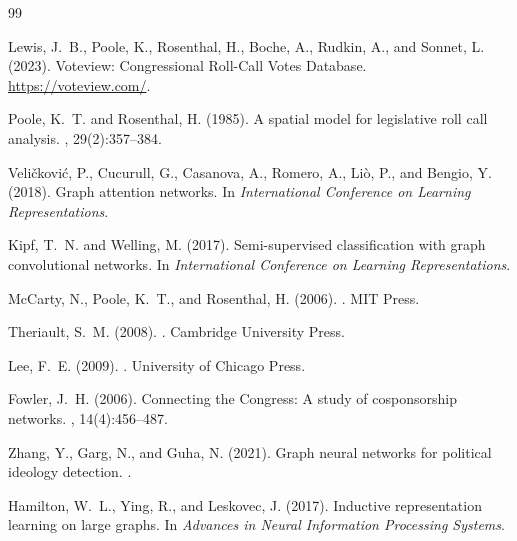 \documentclass[11pt]{article}
\begin{document}
\begin{thebibliography}{99}

Lewis, J.~B., Poole, K., Rosenthal, H., Boche, A., Rudkin, A., and Sonnet, L. (2023).
\newblock Voteview: Congressional Roll-Call Votes Database.
\newblock \url{https://voteview.com/}.

Poole, K.~T. and Rosenthal, H. (1985).
\newblock A spatial model for legislative roll call analysis.
, 29(2):357--384.

Veli\v{c}kovi\'{c}, P., Cucurull, G., Casanova, A., Romero, A., Li\`{o}, P., and Bengio, Y. (2018).
\newblock Graph attention networks.
\newblock In {\em International Conference on Learning Representations}.

Kipf, T.~N. and Welling, M. (2017).
\newblock Semi-supervised classification with graph convolutional networks.
\newblock In {\em International Conference on Learning Representations}.

McCarty, N., Poole, K.~T., and Rosenthal, H. (2006).
.
\newblock MIT Press.

Theriault, S.~M. (2008).
.
\newblock Cambridge University Press.

Lee, F.~E. (2009).
.
\newblock University of Chicago Press.

Fowler, J.~H. (2006).
\newblock Connecting the Congress: A study of cosponsorship networks.
, 14(4):456--487.

Zhang, Y., Garg, N., and Guha, N. (2021).
\newblock Graph neural networks for political ideology detection.
.

Hamilton, W.~L., Ying, R., and Leskovec, J. (2017).
\newblock Inductive representation learning on large graphs.
\newblock In {\em Advances in Neural Information Processing Systems}.


\end{thebibliography}
\end{document}
